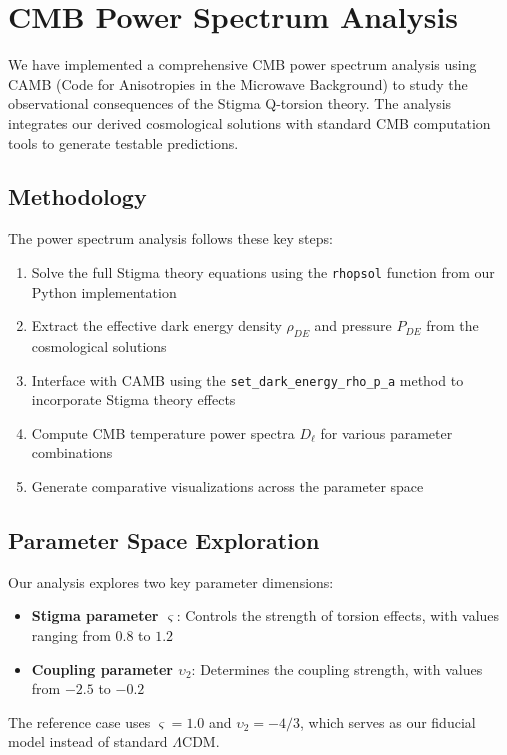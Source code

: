 \documentclass{article}
\begin{document}
\section{CMB Power Spectrum Analysis}

We have implemented a comprehensive CMB power spectrum analysis using CAMB (Code for Anisotropies in the Microwave Background) to study the observational consequences of the Stigma Q-torsion theory. The analysis integrates our derived cosmological solutions with standard CMB computation tools to generate testable predictions.

\subsection{Methodology}

The power spectrum analysis follows these key steps:
\begin{enumerate}
\item Solve the full Stigma theory equations using the \texttt{rhopsol} function from our Python implementation
\item Extract the effective dark energy density $\rho_{DE}$ and pressure $P_{DE}$ from the cosmological solutions
\item Interface with CAMB using the \texttt{set\_dark\_energy\_rho\_p\_a} method to incorporate Stigma theory effects
\item Compute CMB temperature power spectra $D_\ell$ for various parameter combinations
\item Generate comparative visualizations across the parameter space
\end{enumerate}

\subsection{Parameter Space Exploration}

Our analysis explores two key parameter dimensions:

\begin{itemize}
\item \textbf{Stigma parameter $\varsigma$}: Controls the strength of torsion effects, with values ranging from $0.8$ to $1.2$
\item \textbf{Coupling parameter $\upsilon_2$}: Determines the coupling strength, with values from $-2.5$ to $-0.2$
\end{itemize}

The reference case uses $\varsigma = 1.0$ and $\upsilon_2 = -4/3$, which serves as our fiducial model instead of standard $\Lambda$CDM.
\end{document}
